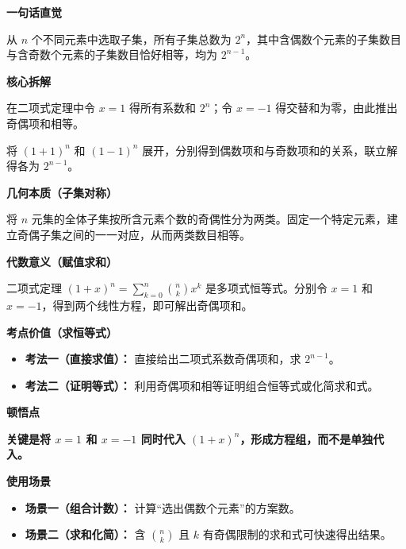 \begin{explanationbox}

	\textbf{\textcolor{CExplanation}{一句话直觉}}

	从 $n$ 个不同元素中选取子集，所有子集总数为 $2^n$，其中含偶数个元素的子集数目与含奇数个元素的子集数目恰好相等，均为 $2^{n-1}$。

	\medskip
	\textbf{\textcolor{CExplanation}{核心拆解}}
	\begin{description}[style=nextline, leftmargin=2.8em, labelsep=0.5em, itemsep=0.45em]
		\item[\textbf{要点一（二项式赋值）：}] 在二项式定理中令 $x=1$ 得所有系数和 $2^n$；令 $x=-1$ 得交替和为零，由此推出奇偶项和相等。
		\item[\textbf{要点二（奇偶分离）：}] 将 $(1+1)^n$ 和 $(1-1)^n$ 展开，分别得到偶数项和与奇数项和的关系，联立解得各为 $2^{n-1}$。
	\end{description}

	\medskip
	\textbf{\textcolor{CExplanation}{几何本质（子集对称）}}

	将 $n$ 元集的全体子集按所含元素个数的奇偶性分为两类。固定一个特定元素，建立奇偶子集之间的一一对应，从而两类数目相等。

	\medskip
	\textbf{\textcolor{CExplanation}{代数意义（赋值求和）}}

	二项式定理 $(1+x)^n = \sum_{k=0}^n \binom{n}{k}x^k$ 是多项式恒等式。分别令 $x=1$ 和 $x=-1$，得到两个线性方程，即可解出奇偶项和。

	\medskip
	\textbf{\textcolor{CExplanation}{考点价值（求恒等式）}}
	\begin{itemize}[leftmargin=*, itemsep=0.5em, topsep=0.4em]
		\item \textbf{考法一（直接求值）：} 直接给出二项式系数奇偶项和，求 $2^{n-1}$。
		\item \textbf{考法二（证明等式）：} 利用奇偶项和相等证明组合恒等式或化简求和式。
	\end{itemize}

	\medskip
	\textbf{\textcolor{CExplanation}{顿悟点}}

	\textbf{关键是将 $x=1$ 和 $x=-1$ 同时代入 $(1+x)^n$，形成方程组，而不是单独代入。}

	\medskip
	\textbf{\textcolor{CExplanation}{使用场景}}
	\begin{itemize}[leftmargin=*, itemsep=0.5em, topsep=0.4em]
		\item \textbf{场景一（组合计数）：} 计算“选出偶数个元素”的方案数。
		\item \textbf{场景二（求和化简）：} 含 $\binom{n}{k}$ 且 $k$ 有奇偶限制的求和式可快速得出结果。
	\end{itemize}

\end{explanationbox}
